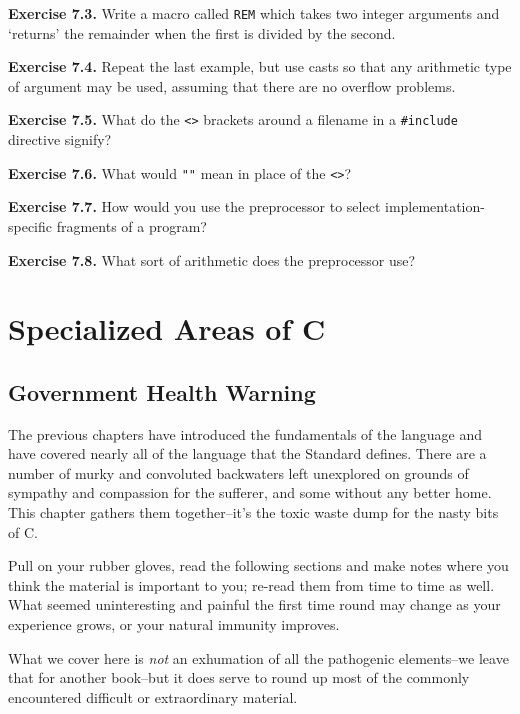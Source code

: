   \textbf{Exercise 7.3.} Write a macro called \texttt{REM} which takes
   two integer arguments and `returns' the remainder when the first
   is divided by the second.


  \textbf{Exercise 7.4.} Repeat the last example, but use casts so that any
   arithmetic type of argument may be used, assuming that there are no
   overflow problems.


  \textbf{Exercise 7.5.} What do the \texttt{<>} brackets around
   a filename in a \texttt{\#include} directive signify?


  \textbf{Exercise 7.6.} What would \texttt{""} mean in place of
   the \texttt{<>}?


  \textbf{Exercise 7.7.} How would you use the preprocessor to select
   implementation-specific fragments of a program?


  \textbf{Exercise 7.8.} What sort of arithmetic does the preprocessor
   use?


 \chapter{Specialized Areas of C}\label{chap:special}


        \section{Government Health Warning}
        

  

  The previous chapters have introduced the fundamentals of the language
   and have covered nearly all of the language that the Standard defines.
   There are a number of murky and convoluted backwaters left unexplored on
   grounds of sympathy and compassion for the sufferer, and some without any
   better home. This chapter gathers them together--it's the toxic waste
   dump for the nasty bits of C.


  Pull on your rubber gloves, read the following sections and make notes
   where you think the material is important to you; re-read them from time
   to time as well. What seemed uninteresting and painful the first time
   round may change as your experience grows, or your natural immunity
   improves.


  What we cover here is \textit{not} an exhumation of all the pathogenic
   elements--we leave that for another book--but it does serve to
   round up most of the commonly encountered difficult or extraordinary
   material.



